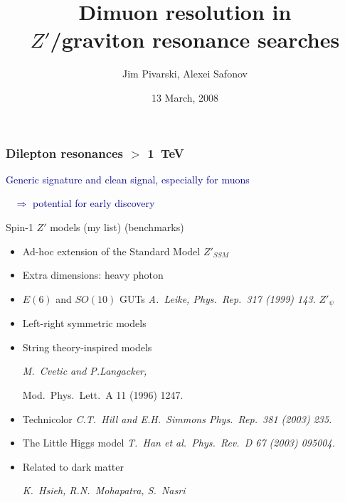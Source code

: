 \documentclass[compress]{beamer}
\title{Dimuon resolution in \\ $Z'$/graviton resonance searches}
\author{Jim Pivarski, Alexei Safonov}
\institute{Texas A\&M University}
\date{13 March, 2008}
\begin{document}
\frame{\titlepage}


\begin{frame}
\frametitle{Dilepton resonances $>$ 1~TeV}

\textcolor{darkblue}{Generic signature and clean signal, especially for muons}

\mbox{ } \hfill \textcolor{darkblue}{$\Rightarrow$ potential for early discovery} \hfill \mbox{ }

\vfill
{\small Spin-1 $Z'$ models (my list) \hfill (benchmarks)}

\vspace{0.25 cm}
\begin{minipage}{\linewidth}\scriptsize
\begin{itemize}
\item Ad-hoc extension of the Standard Model \hfill $Z'_{SSM}$ \hspace{0.3 cm} \mbox{ }
\item Extra dimensions: heavy photon
\item $E(6)$ and $SO(10)$ GUTs {\it A.\ Leike, Phys.\ Rep.\ 317 (1999) 143.} \hfill $Z'_\psi$ \hspace{0.4 cm} \mbox{ }
\item Left-right symmetric models
\item String theory-inspired models {\it M.\ Cvetic and P.Langacker, 

Mod.\ Phys.\ Lett.\ A 11 (1996) 1247.}
\item Technicolor {\it C.T.\ Hill and E.H.\ Simmons Phys.\ Rep.\ 381 (2003) 235.}
\item The Little Higgs model {\it T.\ Han et al.\ Phys.\ Rev.\ D 67 (2003) 095004.}
\item Related to dark matter {\it K.\ Hsieh, R.N.\ Mohapatra, S.\ Nasri

}
\end{itemize}
\end{minipage}
\end{frame}
\end{document}
